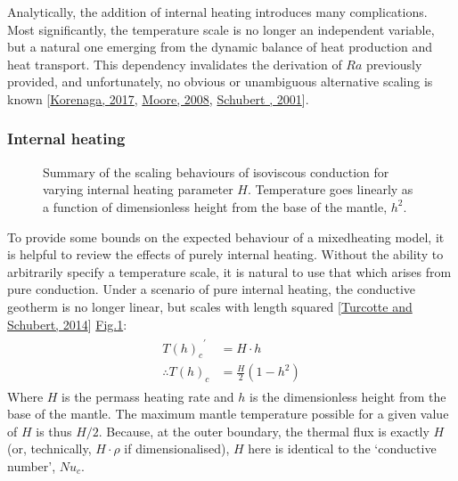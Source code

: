 \documentclass[letterpaper,10pt,english]{jupyterBook}
\begin{document}
\sphinxAtStartPar
Analytically, the addition of internal heating introduces many complications. Most significantly, the temperature scale is no longer an independent variable, but a natural one emerging from the dynamic balance of heat production and heat transport. This dependency invalidates the derivation of \(Ra\) previously provided, and unfortunately, no obvious or unambiguous alternative scaling is known {[}\hyperlink{cite.references:id831}{Korenaga, 2017}, \hyperlink{cite.references:id667}{Moore, 2008}, \hyperlink{cite.references:id663}{Schubert , 2001}{]}.


\subsubsection{Internal heating}
\label{\detokenize{content/chapter_04_isoviscous/background/heating:internal-heating}}
\begin{figure}[htbp]
\centering
\capstart

\noindent{}
\caption{Summary of the scaling behaviours of isoviscous conduction for varying internal heating parameter \(H\). Temperature goes linearly as a function of dimensionless height from the base of the mantle, \(h^2\).}\label{\detokenize{content/chapter_04_isoviscous/background/heating:isocondh}}\end{figure}

\sphinxAtStartPar
To provide some bounds on the expected behaviour of a mixed\sphinxhyphen{}heating model, it is helpful to review the effects of purely internal heating. Without the ability to arbitrarily specify a temperature scale, it is natural to use that which arises from pure conduction. Under a scenario of pure internal heating, the conductive geotherm is no longer linear, but scales with length squared {[}\hyperlink{cite.references:id664}{Turcotte and Schubert, 2014}{]} \hyperref[\detokenize{content/chapter_04_isoviscous/background/heating:isocondh}]{Fig.\@ \ref{\detokenize{content/chapter_04_isoviscous/background/heating:isocondh}}}:
\begin{equation*}
\begin{split} \begin{align*}
{{T(h)}_{c}}^{'} &= H\cdot h \\
\therefore {T(h)}_{c} &= \frac{H}{2} \left( 1 - h^2 \right)
\end{align*} \end{split}
\end{equation*}
\sphinxAtStartPar
Where \(H\) is the per\sphinxhyphen{}mass heating rate and \(h\) is the dimensionless height from the base of the mantle. The maximum mantle temperature possible for a given value of \(H\) is thus \(H/2\). Because, at the outer boundary, the thermal flux is exactly \(H\) (or, technically, \(H \cdot \rho\) if dimensionalised), \(H\) here is identical to the ‘conductive  number’, \({Nu}_{c}\).
\end{document}
